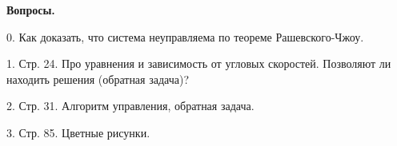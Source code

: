\textbf{Вопросы.}

0. Как доказать, что система неуправляема по теореме Рашевского-Чжоу.

1. Стр. 24. Про уравнения и зависимость от угловых скоростей. Позволяют ли находить решения (обратная задача)?

2. Стр. 31. Алгоритм управления, обратная задача.

3. Стр. 85. Цветные рисунки.

\clearpage

\tableofcontents*
{}
\endTOCtrue
{}